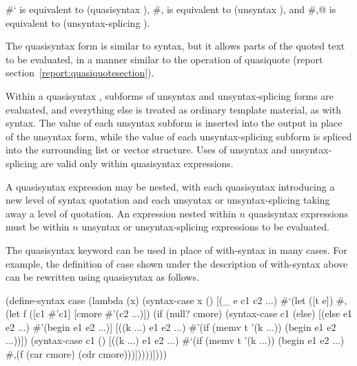 \begin{entry}{%
}

\begin{note}
{\cf \#`} is equivalent to {\cf (quasisyntax
  )}, {\cf \#,} is equivalent to {\cf (unsyntax
  )}, and {\cf \#,@} is equivalent to {\cf (unsyntax-splicing
  )}.
\end{note}

The {\cf quasisyntax} form is similar to {\cf syntax}, but it allows parts
of the quoted text to be evaluated, in a manner similar to the operation
of {\cf quasiquote} (report section~\ref{report:quasiquotesection}).

Within a {\cf quasisyntax} , subforms of
{\cf unsyntax} and {\cf unsyntax-splicing} forms are evaluated,
and everything else is treated as ordinary template material, as
with {\cf syntax}.
The value of each {\cf unsyntax} subform is inserted into the output
in place of the {\cf unsyntax} form, while the value of each
{\cf unsyntax-splicing} subform is spliced into the surrounding list
or vector structure.
Uses of {\cf unsyntax} and {\cf unsyntax-splicing} are valid only within
{\cf quasisyntax} expressions.

A {\cf quasisyntax} expression may be nested, with each {\cf quasisyntax}
introducing a new level of syntax quotation and each {\cf unsyntax} or
{\cf unsyntax-splicing} taking away a level of quotation.
An expression nested within $n$ {\cf quasisyntax} expressions must
be within $n$ {\cf unsyntax} or {\cf unsyntax-splicing} expressions to
be evaluated.

The {\cf quasisyntax} keyword can be used in place of {\cf with-syntax} in many
cases.
For example, the definition of {\cf case} shown under the description
of {\cf with-syntax} above can be rewritten using {\cf quasisyntax}
as follows.

\begin{schemenoindent}
(define-syntax case
  (lambda (x)
    (syntax-case x ()
      [(\_ e c1 c2 ...)
       \#`(let ([t e])
           \#,(let f ([c1 \#'c1] [cmore \#'(c2 ...)])
               (if (null? cmore)
                   (syntax-case c1 (else)
                     [(else e1 e2 ...)
                      \#'(begin e1 e2 ...)]
                     [((k ...) e1 e2 ...)
                      \#'(if (memv t '(k ...))
                             (begin e1 e2 ...))])
                   (syntax-case c1 ()
                     [((k ...) e1 e2 ...)
                      \#`(if (memv t '(k ...))
                            (begin e1 e2 ...)
                            \#,(f (car cmore)
                                  (cdr cmore)))]))))])))
\end{schemenoindent}
                          

\end{entry}
